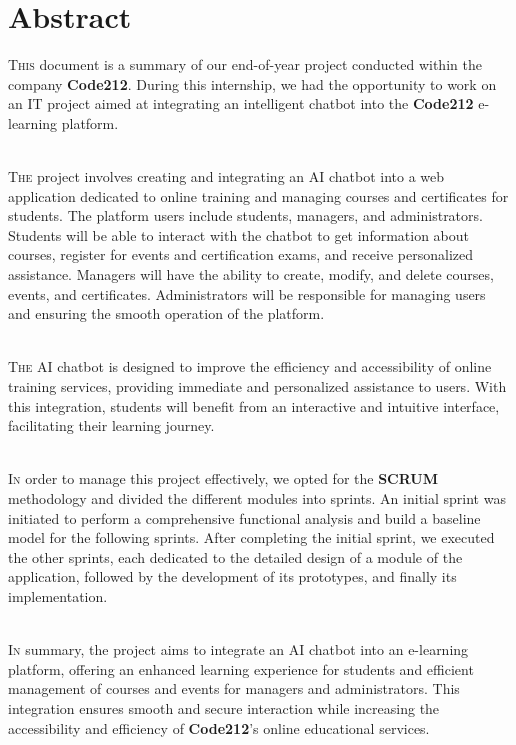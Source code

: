 \chapter*{Abstract}

\lettrine[nindent=0em, slope=-.5em] {\color{Eblue}T}{his} document is a summary of our end-of-year project conducted within the company \textbf{Code212}. During this internship, we had the opportunity to work on an IT project aimed at integrating an intelligent chatbot into the \textbf{Code212} e-learning platform.

\ \\

\lettrine[nindent=0em, slope=-.5em] {\color{Eblue}T}{he} project involves creating and integrating an AI chatbot into a web application dedicated to online training and managing courses and certificates for students. The platform users include students, managers, and administrators. Students will be able to interact with the chatbot to get information about courses, register for events and certification exams, and receive personalized assistance. Managers will have the ability to create, modify, and delete courses, events, and certificates. Administrators will be responsible for managing users and ensuring the smooth operation of the platform.

\ \\

\lettrine[nindent=0em, slope=-.5em] {\color{Eblue}T}{he} AI chatbot is designed to improve the efficiency and accessibility of online training services, providing immediate and personalized assistance to users. With this integration, students will benefit from an interactive and intuitive interface, facilitating their learning journey.

\ \\

\lettrine[nindent=0em, slope=-.5em] {\color{Eblue}I}{n} order to manage this project effectively, we opted for the \textbf{SCRUM} methodology and divided the different modules into sprints. An initial sprint was initiated to perform a comprehensive functional analysis and build a baseline model for the following sprints. After completing the initial sprint, we executed the other sprints, each dedicated to the detailed design of a module of the application, followed by the development of its prototypes, and finally its implementation.

\ \\

\lettrine[nindent=0em, slope=-.5em] {\color{Eblue}I}{n} summary, the project aims to integrate an AI chatbot into an e-learning platform, offering an enhanced learning experience for students and efficient management of courses and events for managers and administrators. This integration ensures smooth and secure interaction while increasing the accessibility and efficiency of \textbf{Code212}'s online educational services.
